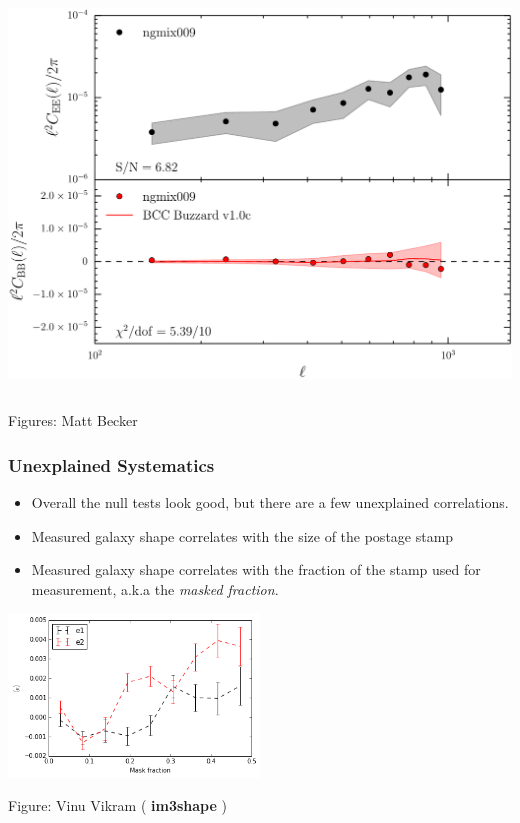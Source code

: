 \documentclass{beamer}
\newcommand{\imshape}{ {\bf im3shape} }
\begin{document}
{\begin{columns}
        \begin{column}{0.5\textwidth}
            \begin{center}
                \includegraphics[width=1.05\textwidth]{ngmix009_eb_crop.pdf}
            \end{center}
        \end{column}

    \end{columns}
    {\tiny Figures: Matt Becker}
}

\frame
{
    \frametitle{Unexplained Systematics}

    \begin{itemize}

        \item Overall the null tests look good, but there are a few unexplained
            correlations.

        \item Measured galaxy shape correlates with the size of the postage stamp
    
         \item Measured galaxy shape correlates with the fraction of the stamp
             used for measurement, a.k.a the {\em masked fraction}.

     \end{itemize}

    \begin{center}
        \includegraphics[width=0.5\textwidth]{im3shape-v-vs-mask-frac.png}
    \end{center}

     {\tiny Figure: Vinu Vikram (\imshape)}
}
\end{document}
